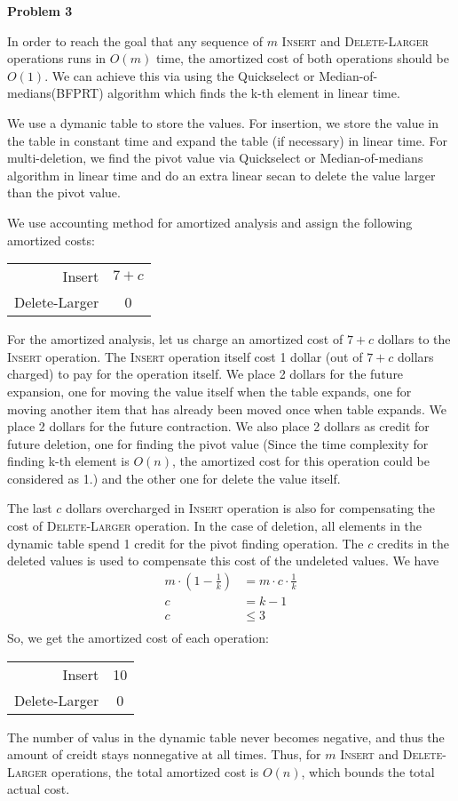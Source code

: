 \documentclass[12pt,letterpaper]{article}
\def\pp{\par\noindent}
\newcommand{\problem}[1]{ \bigskip \pp \textbf{Problem #1}\par}
\begin{document}
\problem{3}
In order to reach the goal that any sequence of $m$ \textsc{Insert} and \textsc{Delete-Larger} operations runs in $O(m)$ time, the amortized cost of both operations should be $O(1)$. We can achieve this via using the Quickselect or Median-of-medians(BFPRT) algorithm which finds the k-th element in linear time.\par
We use a dymanic table to store the values. For insertion, we store the value in the table in constant time and expand the table (if necessary) in linear time. For multi-deletion, we find the pivot value via Quickselect or Median-of-medians algorithm in linear time and do an extra linear secan to delete the value larger than the pivot value.\par
We use accounting method for amortized analysis and assign the following amortized costs:
\begin{center}
	\begin{tabular}{r c}
		Insert & $7+c$\\
		Delete-Larger & 0 \\
	\end{tabular}
\end{center}
For the amortized analysis, let us charge an amortized cost of $7+c$ dollars to the \textsc{Insert} operation. The \textsc{Insert} operation itself cost 1 dollar (out of $7+c$ dollars charged) to pay for the operation itself. We place 2 dollars for the future expansion, one for moving the value itself when the table expands, one for moving another item that has already been moved once when table expands. We place 2 dollars for the future contraction. We also place 2 dollars as credit for future deletion, one for finding the pivot value (Since the time complexity for finding k-th element is $O(n)$, the amortized cost for this operation could be considered as 1.) and the other one for delete the value itself.\par
The last $c$ dollars overcharged in \textsc{Insert} operation is also for compensating the cost of \textsc{Delete-Larger} operation. In the case of deletion, all elements in the dynamic table spend 1 credit for the pivot finding operation. The $c$ credits in the deleted values is used to compensate this cost of the undeleted values. We have
\begin{align*}
	m\cdot(1-\frac{1}{k})&=m\cdot c\cdot\frac{1}{k}\\
	c&=k-1\\
	c&\leq 3\\
\end{align*}
So, we get the amortized cost of each operation:
\begin{center}
	\begin{tabular}{r c}
		Insert & 10\\
		Delete-Larger & 0 \\
	\end{tabular}
\end{center}
The number of valus in the dynamic table never becomes negative, and thus the amount of creidt stays nonnegative at all times. Thus, for $m$ \textsc{Insert} and \textsc{Delete-Larger} operations, the total amortized cost is $O(n)$, which bounds the total actual cost.
\end{document}
